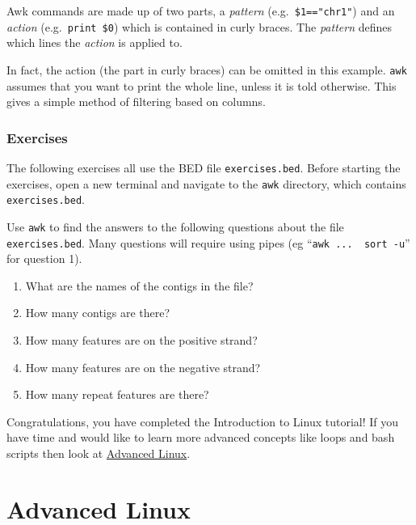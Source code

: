 \documentclass[11pt]{article}
\providecommand{\tightlist}{%
      \setlength{\itemsep}{0pt}\setlength{\parskip}{0pt}}
\begin{document}
Awk commands are made up of two parts, a \textit{pattern}
(e.g.~\texttt{\$1=="chr1"}) and an \textit{action}
(e.g.~\texttt{print\ \$0}) which is contained in curly braces. The
\textit{pattern} defines which lines the \textit{action} is applied to.

In fact, the action (the part in curly braces) can be omitted in this
example. \texttt{awk} assumes that you want to print the whole line,
unless it is told otherwise. This gives a simple method of filtering
based on columns.

    \hypertarget{exercises}{%
\subsubsection{Exercises}\label{exercises}}

The following exercises all use the BED file \texttt{exercises.bed}.
Before starting the exercises, open a new terminal and navigate to the
\texttt{awk} directory, which contains \texttt{exercises.bed}.

Use \texttt{awk} to find the answers to the following questions about
the file \texttt{exercises.bed}. Many questions will require using pipes
(eg ``\texttt{awk\ ...\ \textbar{}\ sort\ -u}'' for question 1).

\begin{enumerate}
\def\labelenumi{\arabic{enumi}.}
\tightlist
\item
  What are the names of the contigs in the file?
\item
  How many contigs are there?
\item
  How many features are on the positive strand?
\item
  How many features are on the negative strand?
\item
  How many repeat features are there?
\end{enumerate}

    Congratulations, you have completed the Introduction to Linux tutorial!
If you have time and would like to learn more advanced concepts like
loops and bash scripts then look at \href{advanced_linux.ipynb}{Advanced
Linux}.





\newpage





    \hypertarget{advanced-linux}{%
\section{Advanced Linux}\label{advanced-linux}}
\end{document}
